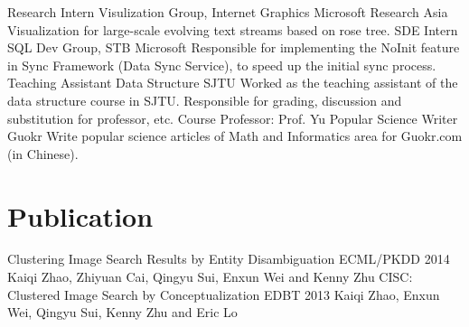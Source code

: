 \documentclass[10pt,a4paper,roman]{moderncv} %
\begin{document}
        {Research Intern}
        {Visulization Group, Internet Graphics}
        {Microsoft Research Asia}
        {}
        {Visualization for large-scale evolving text streams based on rose tree.}
        {SDE Intern}
        {SQL Dev Group, STB}
        {Microsoft}
        {}
        {Responsible for implementing the NoInit feature in Sync Framework (Data Sync Service), to speed up the initial sync process.}
        {Teaching Assistant}
        {Data Structure}
        {SJTU}
        {}
        {Worked as the teaching assistant of the data structure course in SJTU. Responsible for grading, discussion and substitution for professor, etc.\newline{}%
         Course Professor: Prof. Yu\footnotemark[1]{}}
        {Popular Science Writer}
        {Guokr\footnotemark[2]{}}
        {}
        {}
        {Write popular science articles\footnotemark[3]{} of Math and Informatics area for Guokr.com (in Chinese).}

\section{Publication}
        {Clustering Image Search Results by Entity Disambiguation}
        {ECML/PKDD 2014}{}{}
        {Kaiqi Zhao, Zhiyuan Cai, Qingyu Sui, Enxun Wei and Kenny Zhu}
        {CISC: Clustered Image Search by Conceptualization}
        {EDBT 2013}{}{}
        {Kaiqi Zhao, Enxun Wei, Qingyu Sui, Kenny Zhu and Eric Lo}
\end{document}
